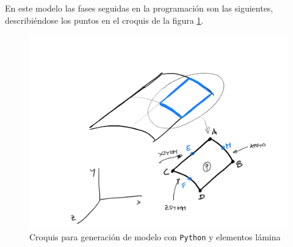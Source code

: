 \documentclass[spanish,a4paper,12pt]{article}
\begin{document}
En este modelo las fases seguidas en la programación son las siguientes, describiéndose los puntos en el croquis de la figura \ref{fig:lamina1}.
\begin{figure}
\centering
	\includegraphics[scale=0.25]{figs/prac3_lamina1_fig.png}
	\caption{Croquis para generación de modelo con \texttt{Python} y elementos lámina}
	\label{fig:lamina1}
\end{figure}
\end{document}
